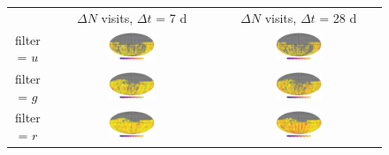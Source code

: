 \documentclass[preprintm,linenumbers]{aastex631}
\begin{document}
		\begin{figure}
			\centering
			\begin{tabular}{c c c}
				& $\Delta N$ visits, $\Delta t$ = 7 d & $\Delta N$ visits, $\Delta t$ = 28 d \\
				filter = $u$ & \includegraphics[width=0.3\textwidth]{results/skymaps/skymaps_delta_first_year_one_snap_v4_0_10yrs_db_noDD_noTwi_CountMetric_doAllTemplateMetrics_reduceCount_u_7_noDD_noTwi} &				
				\includegraphics[width=0.3\textwidth]{results/skymaps/skymaps_delta_first_year_one_snap_v4_0_10yrs_db_noDD_noTwi_CountMetric_doAllTemplateMetrics_reduceCount_u_28_noDD_noTwi} \\
				
				filter = $g$ & \includegraphics[width=0.3\textwidth]{results/skymaps/skymaps_delta_first_year_one_snap_v4_0_10yrs_db_noDD_noTwi_CountMetric_doAllTemplateMetrics_reduceCount_g_7_noDD_noTwi} &				
				\includegraphics[width=0.3\textwidth]{results/skymaps/skymaps_delta_first_year_one_snap_v4_0_10yrs_db_noDD_noTwi_CountMetric_doAllTemplateMetrics_reduceCount_g_28_noDD_noTwi} \\
				
				filter = $r$ & \includegraphics[width=0.3\textwidth]{results/skymaps/skymaps_delta_first_year_one_snap_v4_0_10yrs_db_noDD_noTwi_CountMetric_doAllTemplateMetrics_reduceCount_r_7_noDD_noTwi} &			
				\includegraphics[width=0.3\textwidth]{results/skymaps/skymaps_delta_first_year_one_snap_v4_0_10yrs_db_noDD_noTwi_CountMetric_doAllTemplateMetrics_reduceCount_r_28_noDD_noTwi} \\
				

\end{tabular}
\end{figure}
\end{document}
